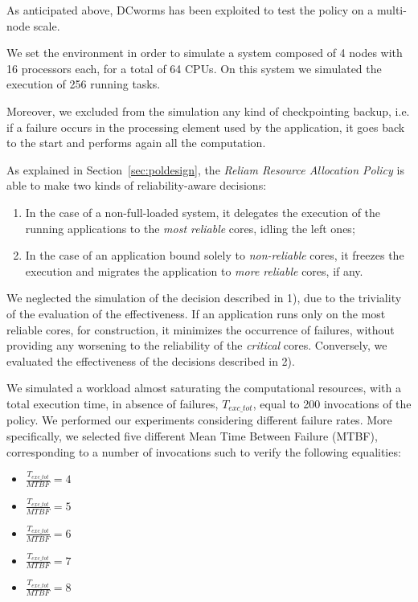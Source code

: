 As anticipated above, DCworms has been exploited to test the policy on a multi-node scale.

We set the environment in order to simulate a system composed of 4 nodes with 16 processors each, for a total of 64 CPUs. On this system we simulated the execution of 256 running tasks.

Moreover, we excluded from the simulation any kind of checkpointing backup, i.e. if a failure occurs in the processing element used by the application, it goes back to the start and performs again all the computation.

As explained in Section~\ref{sec:poldesign}, the \emph{Reliam Resource Allocation Policy} is able to make two kinds of reliability-aware decisions:
\begin{enumerate}[label={\arabic*)}]
    \item In the case of a non-full-loaded system, it delegates the execution of the running applications to the \emph{most reliable} cores, idling the left ones;
    \item In the case of an application bound solely to \emph{non-reliable} cores, it freezes the execution and migrates the application to \emph{more reliable} cores, if any.
\end{enumerate}

We neglected the simulation of the decision described in 1), due to the triviality of the evaluation of the effectiveness. If an application runs only on the most reliable cores, for construction, it minimizes the occurrence of failures, without providing any worsening to the reliability of the \emph{critical} cores.
Conversely, we evaluated the effectiveness of the decisions described in 2).

We simulated a workload almost saturating the computational resources, with a total execution time, in absence of failures, $T_{exc\_tot}$, equal to 200 invocations of the policy. We performed our experiments considering different failure rates. More specifically, we selected five different Mean Time Between Failure (MTBF), corresponding to a number of invocations such to verify the following equalities:
\begin{itemize}
    \item $\frac{T_{exc\_tot}}{MTBF}=4$
    \item $\frac{T_{exc\_tot}}{MTBF}=5$
    \item $\frac{T_{exc\_tot}}{MTBF}=6$
    \item $\frac{T_{exc\_tot}}{MTBF}=7$
    \item $\frac{T_{exc\_tot}}{MTBF}=8$
\end{itemize}

